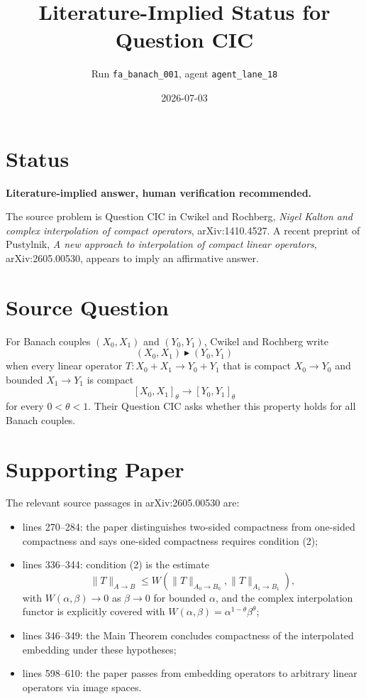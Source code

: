 \documentclass[11pt]{article}
\title{Literature-Implied Status for Question CIC}
\author{Run \texttt{fa\_banach\_001}, agent \texttt{agent\_lane\_18}}
\date{2026-07-03}
\begin{document}
\maketitle

\section*{Status}

\textbf{Literature-implied answer, human verification recommended.}

The source problem is Question CIC in Cwikel and Rochberg, \emph{Nigel Kalton and complex interpolation of compact operators}, arXiv:1410.4527. A recent preprint of Pustylnik, \emph{A new approach to interpolation of compact linear operators}, arXiv:2605.00530, appears to imply an affirmative answer.

\section*{Source Question}

For Banach couples \((X_0,X_1)\) and \((Y_0,Y_1)\), Cwikel and Rochberg write
\[
(X_0,X_1)\blacktriangleright(Y_0,Y_1)
\]
when every linear operator \(T:X_0+X_1\to Y_0+Y_1\) that is compact \(X_0\to Y_0\) and bounded \(X_1\to Y_1\) is compact
\[
[X_0,X_1]_\theta\to [Y_0,Y_1]_\theta
\]
for every \(0<\theta<1\). Their Question CIC asks whether this property holds for all Banach couples.

\section*{Supporting Paper}

The relevant source passages in arXiv:2605.00530 are:
\begin{itemize}
\item lines 270--284: the paper distinguishes two-sided compactness from one-sided compactness and says one-sided compactness requires condition (2);
\item lines 336--344: condition (2) is the estimate
\[
\|T\|_{A\to B}\le W(\|T\|_{A_0\to B_0},\|T\|_{A_1\to B_1}),
\]
with \(W(\alpha,\beta)\to0\) as \(\beta\to0\) for bounded \(\alpha\), and the complex interpolation functor is explicitly covered with \(W(\alpha,\beta)=\alpha^{1-\theta}\beta^\theta\);
\item lines 346--349: the Main Theorem concludes compactness of the interpolated embedding under these hypotheses;
\item lines 598--610: the paper passes from embedding operators to arbitrary linear operators via image spaces.
\end{itemize}
\end{document}
